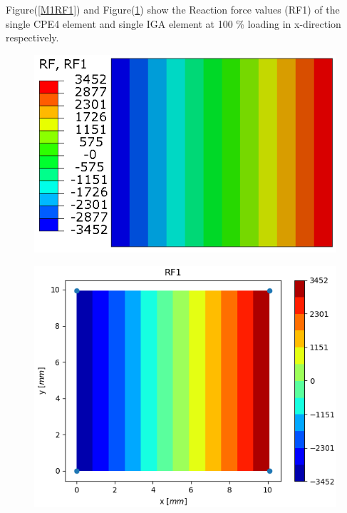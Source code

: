 \documentclass[11pt]{article}
\begin{document}
Figure(\ref{M1RF1}) and Figure(\ref{M1RF1_IGA}) show the Reaction force values (RF1) of the single CPE4 element and single IGA element at 100 \% loading in x-direction respectively. \\
\begin{figure}[H]
	\centering
	\begin{minipage}{.5\textwidth}
		\centering
		\includegraphics[width=1\linewidth]{M1RF1.png}
		\label{M1RF1}
	\end{minipage}%
	\begin{minipage}{.5\textwidth}
		\centering
		\includegraphics[width=1\linewidth]{M1RF1_IGA.png}
		\label{M1RF1_IGA}
	\end{minipage}
\end{figure}
\end{document}
